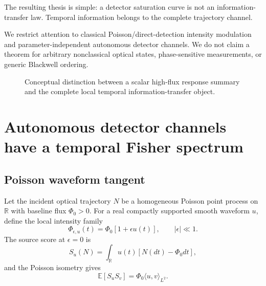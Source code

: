 \documentclass[aps,prapplied,preprint,nofootinbib]{revtex4-2}
\newcommand{\E}{\mathbb E}
\newcommand{\R}{\mathbb R}
\begin{document}
The resulting thesis is simple: a detector saturation curve is not an information-transfer law. Temporal information belongs to the complete trajectory channel.

We restrict attention to classical Poisson/direct-detection intensity modulation and parameter-independent autonomous detector channels. We do not claim a theorem for arbitrary nonclassical optical states, phase-sensitive measurements, or generic Blackwell ordering.

\begin{figure}[t]
\centering
{}
\caption{Conceptual distinction between a scalar high-flux response summary and the complete local temporal information-transfer object.}
\label{fig:concept}
\end{figure}

\section{Autonomous detector channels have a temporal Fisher spectrum}
\label{sec:general}

\subsection{Poisson waveform tangent}

Let the incident optical trajectory $N$ be a homogeneous Poisson point process on $\R$ with baseline flux $\Phi_0>0$. For a real compactly supported smooth waveform $u$, define the local intensity family
\begin{equation}
\Phi_{\epsilon,u}(t)=\Phi_0[1+\epsilon u(t)],
\qquad |\epsilon|\ll1.
\end{equation}
The source score at $\epsilon=0$ is
\begin{equation}
S_u(N)=\int_{\R}u(t)[N(dt)-\Phi_0dt],
\label{eq:sourceScore}
\end{equation}
and the Poisson isometry gives
\begin{equation}
\E[S_uS_v]=\Phi_0\langle u,v\rangle_{L^2}.
\label{eq:sourceFisher}
\end{equation}
\end{document}
